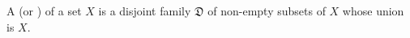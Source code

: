 A  (or ) of a set $X$ is a disjoint family $\mathfrak{D}$ of non-empty subsets of $X$ whose union is $X$.
